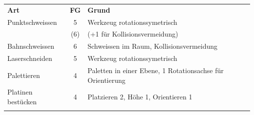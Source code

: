 \begin{minipage}{0.5\linewidth}
{\small 
\begin{tabular}{lcp{5.3cm}}
	\textbf{Art}& \textbf{FG}&\textbf{Grund}\\
	Punktschweissen& 5& Werkzeug rotationssymetrisch\\
	&(6)&(+1 für Kollisionsvermeidung)\\
	Bahnschweissen&6&Schweissen im Raum, Kollisionsvermeidung\\
	Laserschneiden&5&Werkzeug rotationssymetrisch\\
	Palettieren&4&Paletten in einer Ebene, 1 Rotationsachse für Orientierung\\
	Platinen bestücken&4&Platzieren 2, Höhe 1, Orientieren 1\\
	&&\\
\end{tabular}
}
\end{minipage}

